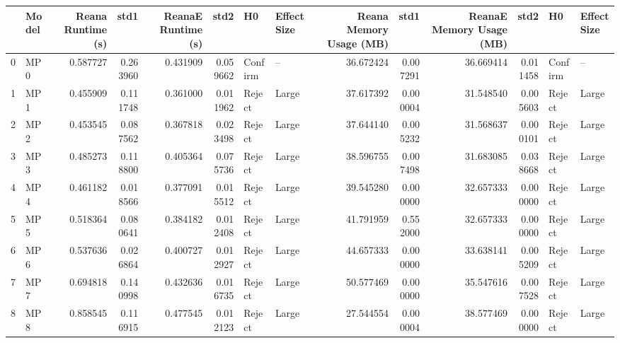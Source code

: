 \begin{tabular}{llrrrrllrrrrll}
\toprule
{} &  Model &  Reana Runtime (s) &      std1 &  ReanaE Runtime (s) &      std2 &       H0 & Effect Size &  Reana Memory Usage (MB) &        std1 &  ReanaE Memory Usage (MB) &        std2 &       H0 & Effect Size \\
\midrule
0  &   MP 0 &           0.587727 &  0.263960 &            0.431909 &  0.059662 &  Confirm &          -- &                36.672424 &    0.007291 &                 36.669414 &    0.011458 &  Confirm &          -- \\
1  &   MP 1 &           0.455909 &  0.111748 &            0.361000 &  0.011962 &   Reject &       Large &                37.617392 &    0.000004 &                 31.548540 &    0.005603 &   Reject &       Large \\
2  &   MP 2 &           0.453545 &  0.087562 &            0.367818 &  0.023498 &   Reject &       Large &                37.644140 &    0.005232 &                 31.568637 &    0.000101 &   Reject &       Large \\
3  &   MP 3 &           0.485273 &  0.118800 &            0.405364 &  0.075736 &   Reject &       Large &                38.596755 &    0.007498 &                 31.683085 &    0.038668 &   Reject &       Large \\
4  &   MP 4 &           0.461182 &  0.018566 &            0.377091 &  0.015512 &   Reject &       Large &                39.545280 &    0.000000 &                 32.657333 &    0.000000 &   Reject &       Large \\
5  &   MP 5 &           0.518364 &  0.080641 &            0.384182 &  0.012408 &   Reject &       Large &                41.791959 &    0.552000 &                 32.657333 &    0.000000 &   Reject &       Large \\
6  &   MP 6 &           0.537636 &  0.026864 &            0.400727 &  0.012927 &   Reject &       Large &                44.657333 &    0.000000 &                 33.638141 &    0.005209 &   Reject &       Large \\
7  &   MP 7 &           0.694818 &  0.140998 &            0.432636 &  0.016735 &   Reject &       Large &                50.577469 &    0.000000 &                 35.547616 &    0.007528 &   Reject &       Large \\
8  &   MP 8 &           0.858545 &  0.116915 &            0.477545 &  0.012123 &   Reject &       Large &                27.544554 &    0.000004 &                 38.577469 &    0.000000 &   Reject &       Large \\

\end{tabular}
